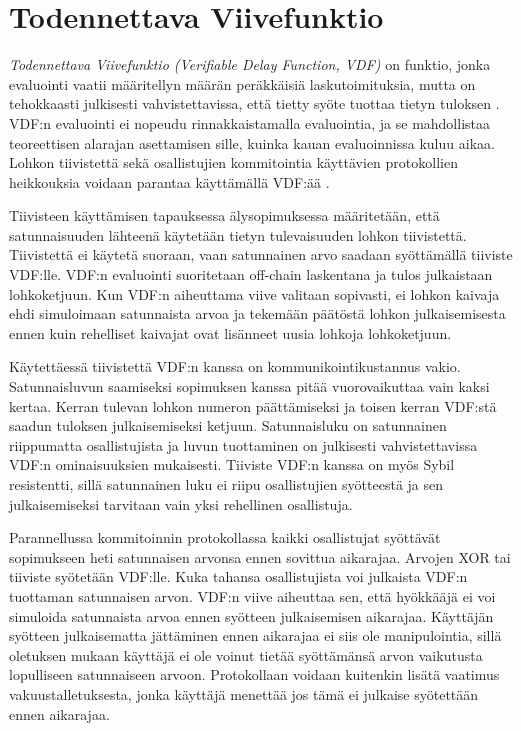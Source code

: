 \section{Todennettava Viivefunktio}
\textit{Todennettava Viivefunktio  (Verifiable Delay Function, VDF)} on funktio, jonka evaluointi vaatii määritellyn määrän peräkkäisiä laskutoimituksia, mutta on tehokkaasti julkisesti vahvistettavissa, että tietty syöte tuottaa tietyn tuloksen \cite{boneh_verifiable_2018}. VDF:n evaluointi ei nopeudu rinnakkaistamalla evaluointia, ja se mahdollistaa teoreettisen alarajan asettamisen sille, kuinka kauan evaluoinnissa kuluu aikaa. Lohkon tiivistettä sekä osallistujien kommitointia käyttävien protokollien heikkouksia voidaan parantaa käyttämällä VDF:ää \cite{boneh_verifiable_2018}. 

Tiivisteen käyttämisen tapauksessa älysopimuksessa määritetään, että satunnaisuuden lähteenä käytetään tietyn tulevaisuuden lohkon tiivistettä. Tiivistettä ei käytetä suoraan, vaan satunnainen arvo saadaan syöttämällä tiiviste VDF:lle. VDF:n evaluointi suoritetaan off-chain laskentana ja tulos julkaistaan lohkoketjuun. Kun VDF:n aiheuttama viive valitaan sopivasti, ei lohkon kaivaja ehdi simuloimaan satunnaista arvoa ja tekemään päätöstä lohkon julkaisemisesta ennen kuin rehelliset kaivajat ovat lisänneet uusia lohkoja lohkoketjuun.

Käytettäessä tiivistettä VDF:n kanssa on kommunikointikustannus vakio. Satunnaisluvun saamiseksi sopimuksen kanssa pitää vuorovaikuttaa vain kaksi kertaa. Kerran tulevan lohkon numeron päättämiseksi ja toisen kerran VDF:stä saadun tuloksen julkaisemiseksi ketjuun. Satunnaisluku on satunnainen riippumatta osallistujista ja luvun tuottaminen on julkisesti vahvistettavissa VDF:n ominaisuuksien mukaisesti. Tiiviste VDF:n kanssa on myös Sybil resistentti, sillä satunnainen luku ei riipu osallistujien syötteestä ja sen julkaisemiseksi tarvitaan vain yksi rehellinen osallistuja.

Parannellussa kommitoinnin protokollassa kaikki osallistujat syöttävät sopimukseen heti satunnaisen arvonsa ennen sovittua aikarajaa. Arvojen XOR tai tiiviste syötetään VDF:lle. Kuka tahansa osallistujista voi julkaista VDF:n tuottaman satunnaisen arvon. VDF:n viive aiheuttaa sen, että hyökkääjä ei voi simuloida satunnaista arvoa ennen syötteen julkaisemisen aikarajaa. Käyttäjän syötteen julkaisematta jättäminen ennen aikarajaa ei siis ole manipulointia, sillä oletuksen mukaan käyttäjä ei ole voinut tietää syöttämänsä arvon vaikutusta lopulliseen satunnaiseen arvoon. Protokollaan voidaan kuitenkin lisätä vaatimus vakuustalletuksesta, jonka käyttäjä menettää jos tämä ei julkaise syötettään ennen aikarajaa.

